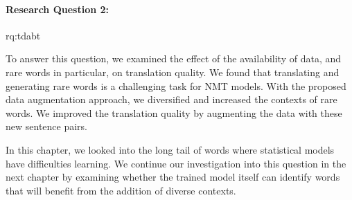 \paragraph{Research Question 2:} \acl{rq:tdabt} 

\medskip

 \noindent To answer this question, we examined the effect of the availability of data, and rare words in particular, on translation quality.
We found that translating and generating rare words is a challenging task for NMT models. 
With the proposed data augmentation approach, we diversified and increased the contexts of rare words.
We improved the translation quality by augmenting the data with these new sentence pairs.

\medskip

 \noindent In this chapter, we looked into the long tail of words where statistical models have difficulties learning. 
We continue our investigation into this question in the next chapter by examining whether the trained model itself can identify words that will benefit from the addition of diverse contexts.


